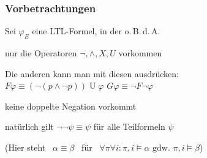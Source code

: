     \begin{frame}
      \frametitle{Vorbetrachtungen}

      Sei $\varphi_E$ eine LTL-Formel, in der o.\,B.\,d.\,A.\
      \begin{Itemize}
        \item
          nur die Operatoren $\neg,\land,X,U$ vorkommen
          \par\smallskip
          \begin{small}
            \qquad Die anderen kann man mit diesen ausdrücken:\\
            \qquad $F\varphi \equiv (\lnot(p \land \lnot p)) \mathbin U \varphi$\qquad
                    $G\varphi \equiv \lnot F \lnot \varphi$
            \par
          \end{small}
          \par\smallskip
        \item
          keine doppelte Negation vorkommt
          \par\smallskip
          \begin{small}
            \qquad natürlich gilt $\lnot\lnot\psi \equiv \psi$ für alle Teilformeln $\psi$
            \par
          \end{small}
      \end{Itemize}
      \begin{small}
        (Hier steht ~$\alpha \equiv \beta$~ für ~$\forall \pi \forall i : \pi,i \models \alpha \text{ gdw.\ } \pi,i \models \beta$)
        \par
      \end{small}


      \par\bigskip


\end{frame}
